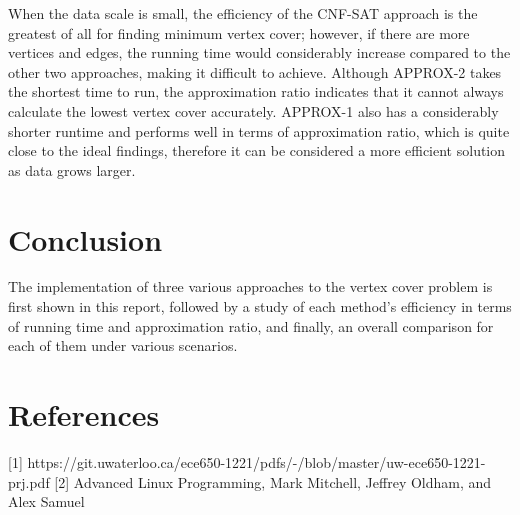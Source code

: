 \documentclass[11pt roman]{article}
\begin{document}
When the data scale is small, the efficiency of the CNF-SAT approach is the greatest of all for finding minimum vertex cover; however, if there are more vertices and edges, the running time would considerably increase compared to the other two approaches, making it difficult to achieve. Although APPROX-2 takes the shortest time to run, the approximation ratio indicates that it cannot always calculate the lowest vertex cover accurately. APPROX-1 also has a considerably shorter runtime and performs well in terms of approximation ratio, which is quite close to the ideal findings, therefore it can be considered a more efficient solution as data grows larger.



\section{Conclusion}
The implementation of three various approaches to the vertex cover problem is first shown in this report, followed by a study of each method's efficiency in terms of running time and approximation ratio, and finally, an overall comparison for each of them under various scenarios.

\newpage\section{References}
[1] https://git.uwaterloo.ca/ece650-1221/pdfs/-/blob/master/uw-ece650-1221-prj.pdf 
[2] Advanced Linux Programming, Mark Mitchell, Jeffrey Oldham, and Alex Samuel
\end{document}
